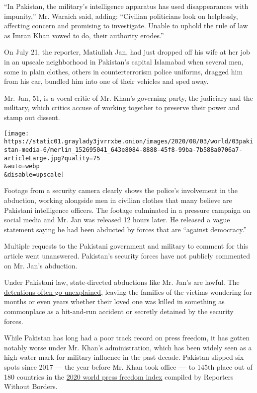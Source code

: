 ``In Pakistan, the military's intelligence apparatus has used
disappearances with impunity,'' Mr. Waraich said, adding: ``Civilian
politicians look on helplessly, affecting concern and promising to
investigate. Unable to uphold the rule of law as Imran Khan vowed to do,
their authority erodes.''

On July 21, the reporter, Matiullah Jan, had just dropped off his wife
at her job in an upscale neighborhood in Pakistan's capital Islamabad
when several men, some in plain clothes, others in counterterrorism
police uniforms, dragged him from his car, bundled him into one of their
vehicles and sped away.

Mr. Jan, 51, is a vocal critic of Mr. Khan's governing party, the
judiciary and the military, which critics accuse of working together to
preserve their power and stamp out dissent.

\texttt{[image: https://static01.graylady3jvrrxbe.onion/images/2020/08/03/world/03pakistan-media-6/merlin\_152695041\_643e8084-8888-45f8-99ba-7b588a0706a7-articleLarge.jpg?quality=75\\\&auto=webp\\\&disable=upscale]}

Footage from a security camera clearly shows the police's involvement in
the abduction, working alongside men in civilian clothes that many
believe are Pakistani intelligence officers. The footage culminated in a
pressure campaign on social media and Mr. Jan was released 12 hours
later. He released a vague statement saying he had been abducted by
forces that are ``against democracy.''

Multiple requests to the Pakistani government and military to comment
for this article went unanswered. Pakistan's security forces have not
publicly commented on Mr. Jan's abduction.

Under Pakistani law, state-directed abductions like Mr. Jan's are
lawful. The
\href{https://www.nytimes3xbfgragh.onion/2007/01/14/world/asia/14pakistan.html}{detentions
often go unexplained}, leaving the families of the victims wondering for
months or even years whether their loved one was killed in something as
commonplace as a hit-and-run accident or secretly detained by the
security forces.

While Pakistan has long had a poor track record on press freedom, it has
gotten notably worse under Mr. Khan's administration, which has been
widely seen as a high-water mark for military influence in the past
decade. Pakistan slipped six spots since 2017 --- the year before Mr.
Khan took office \textbf{---} to 145th place out of 180 countries in the
\href{https://rsf.org/en/pakistan}{2020 world press freedom index}
compiled by Reporters Without Borders.


